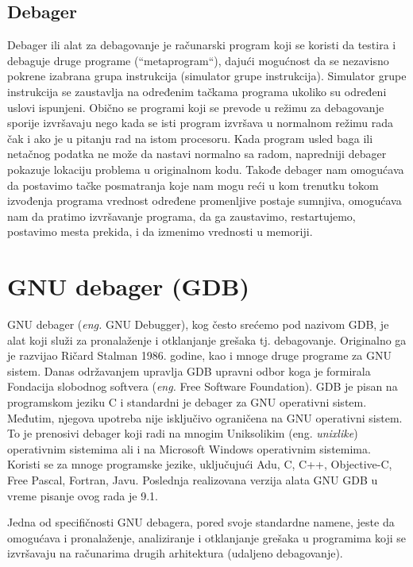\documentclass[a4paper]{article}
\begin{document}
\subsection{Debager}
\label{subsec:debager}
Debager ili alat za debagovanje je računarski program koji se koristi da testira i 
debaguje druge programe (``metaprogram``), dajući mogućnost da se nezavisno 
pokrene izabrana grupa instrukcija (simulator grupe instrukcija). Simulator grupe instrukcija se zaustavlja
na određenim tačkama programa ukoliko su određeni uslovi ispunjeni.
Obično se programi koji se prevode u režimu za debagovanje
sporije izvršavaju nego kada se isti program izvršava u normalnom režimu rada čak i ako je 
u pitanju rad na istom procesoru\cite{debugger}.  Kada program usled baga ili netačnog podatka ne može da 
nastavi normalno sa radom, napredniji debager pokazuje lokaciju problema u originalnom kodu. Takođe
debager nam omogućava da postavimo tačke posmatranja koje nam
mogu reći u kom trenutku tokom izvođenja programa vrednost
određene promenljive postaje sumnjiva, omogućava nam da
pratimo izvršavanje programa, da ga zaustavimo, restartujemo,
postavimo mesta prekida, i da izmenimo vrednosti u memoriji. 

\section{GNU debager (GDB)}
\label{sec:GDB}
GNU debager (\textit{eng.} GNU Debugger), kog često srećemo pod nazivom GDB, je alat koji služi za pronalaženje 
i otklanjanje grešaka tj. debagovanje. Originalno ga je razvijao Ričard Stalman 1986. godine, kao i mnoge druge programe 
za GNU sistem\cite{gdb}. Danas održavanjem upravlja GDB upravni odbor koga je formirala Fondacija 
slobodnog softvera (\textit{eng.} Free Software Foundation).
GDB je pisan na programskom jeziku C i standardni je debager za GNU operativni sistem. 
Međutim, njegova upotreba nije isključivo ograničena na GNU operativni sistem. To je prenosivi debager
koji radi na mnogim Uniksolikim (eng. \textit{unixlike}) operativnim sistemima ali i na Microsoft Windows operativnim 
sistemima. Koristi se za mnoge programske jezike, uključujući
Adu, C, C++, Objective-C, Free Pascal, Fortran, Javu.
Poslednja realizovana verzija alata GNU GDB u vreme pisanje ovog rada je 9.1\cite{sourceware}. 

Jedna od specifičnosti GNU debagera, pored svoje standardne namene, jeste da omogućava i 
pronalaženje, analiziranje i otklanjanje grešaka u programima koji se izvršavaju na računarima drugih 
arhitektura (udaljeno debagovanje)\cite{master_rad}.
\end{document}
